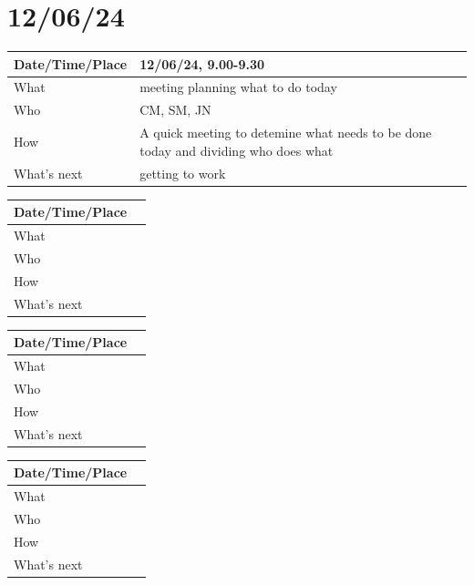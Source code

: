 \documentclass{article}
\begin{document}
\section{12/06/24}

\begin{table}[H]
\begin{tabular}{|p{1.5in}|p{4in}|}
\hline
Date/Time/Place & 12/06/24, 9.00-9.30 \\ \hline
What            & meeting planning what to do today \\ \hline
Who             & CM, SM, JN \\ \hline
How             & A quick meeting to detemine what needs to be done today and dividing who does what \\ \hline
What's next     &  getting to work\\ \hline
\end{tabular}
\end{table}

\begin{table}[H]
\begin{tabular}{|p{1.5in}|p{4in}|}
\hline
Date/Time/Place &  \\ \hline
What            &  \\ \hline
Who             &  \\ \hline
How             &  \\ \hline
What's next     &  \\ \hline
\end{tabular}
\end{table}

\begin{table}[H]
\begin{tabular}{|p{1.5in}|p{4in}|}
\hline
Date/Time/Place &  \\ \hline
What            &  \\ \hline
Who             &  \\ \hline
How             &  \\ \hline
What's next     &  \\ \hline
\end{tabular}
\end{table}

\begin{table}[H]
\begin{tabular}{|p{1.5in}|p{4in}|}
\hline
Date/Time/Place &  \\ \hline
What            &  \\ \hline
Who             &  \\ \hline
How             &  \\ \hline
What's next     &  \\ \hline
\end{tabular}
\end{table}
\end{document}
